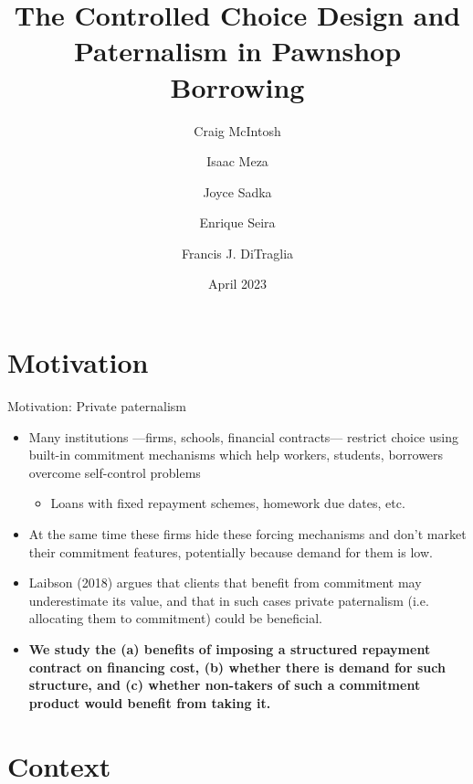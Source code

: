 \documentclass[8pt]{beamer}
\title{The Controlled Choice Design and Paternalism in Pawnshop Borrowing}
\author{Craig McIntosh\inst{1} \and Isaac Meza\inst{2} \and Joyce Sadka\inst{3} \and Enrique Seira\inst{4} \and Francis J. DiTraglia\inst{5} }
\institute[UTran]{\inst{1} UCSD, \inst{2} Harvard , \inst{3} ITAM , \inst{4} MSU , \inst{5} Oxford}
\date{April 2023}
\begin{document}
\begin{frame}[c, noframenumbering]%
\titlepage
\end{frame}


\section{Motivation}



\begin{frame}{Motivation: Private paternalism}
\begin{itemize}
    \vfill \item Many institutions —firms, schools, financial contracts— restrict choice using built-in commitment mechanisms which help workers, students, borrowers overcome self-control problems
    \begin{itemize}
        \item Loans with fixed repayment schemes, homework due dates, etc.
    \end{itemize}
    \vfill \pause\item At the same time these firms hide these forcing mechanisms and don’t market their commitment features, potentially because demand for them is low.
    \vfill  \item  Laibson (2018) argues that clients that benefit from commitment may underestimate its value, and that in such cases private paternalism (i.e. allocating them to commitment) could be beneficial.
    \vfill  \pause\item  \textbf{We study the (a) benefits of imposing a structured repayment contract on financing cost, (b) whether there is demand for such structure, and (c) whether non-takers of such a commitment product would benefit from taking it.}
\end{itemize}

\end{frame}



\section{Context}
\end{document}
